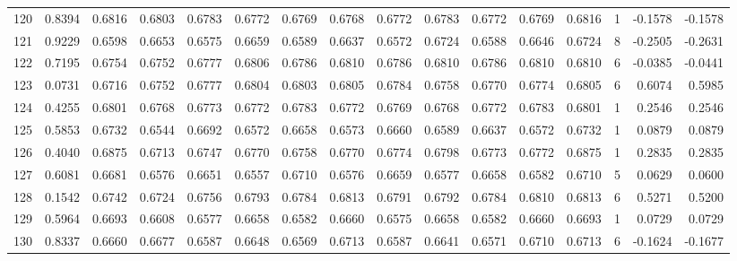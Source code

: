 \begin{tabular}{lrrrrrrrrrrrrrrr}
120 &      0.8394 &  0.6816 &  0.6803 &  0.6783 &  0.6772 &  0.6769 &  0.6768 &  0.6772 &  0.6783 &  0.6772 &   0.6769 &     0.6816 &      1 &                   -0.1578 &                    -0.1578 \\
121 &      0.9229 &  0.6598 &  0.6653 &  0.6575 &  0.6659 &  0.6589 &  0.6637 &  0.6572 &  0.6724 &  0.6588 &   0.6646 &     0.6724 &      8 &                   -0.2505 &                    -0.2631 \\
122 &      0.7195 &  0.6754 &  0.6752 &  0.6777 &  0.6806 &  0.6786 &  0.6810 &  0.6786 &  0.6810 &  0.6786 &   0.6810 &     0.6810 &      6 &                   -0.0385 &                    -0.0441 \\
123 &      0.0731 &  0.6716 &  0.6752 &  0.6777 &  0.6804 &  0.6803 &  0.6805 &  0.6784 &  0.6758 &  0.6770 &   0.6774 &     0.6805 &      6 &                    0.6074 &                     0.5985 \\
124 &      0.4255 &  0.6801 &  0.6768 &  0.6773 &  0.6772 &  0.6783 &  0.6772 &  0.6769 &  0.6768 &  0.6772 &   0.6783 &     0.6801 &      1 &                    0.2546 &                     0.2546 \\
125 &      0.5853 &  0.6732 &  0.6544 &  0.6692 &  0.6572 &  0.6658 &  0.6573 &  0.6660 &  0.6589 &  0.6637 &   0.6572 &     0.6732 &      1 &                    0.0879 &                     0.0879 \\
126 &      0.4040 &  0.6875 &  0.6713 &  0.6747 &  0.6770 &  0.6758 &  0.6770 &  0.6774 &  0.6798 &  0.6773 &   0.6772 &     0.6875 &      1 &                    0.2835 &                     0.2835 \\
127 &      0.6081 &  0.6681 &  0.6576 &  0.6651 &  0.6557 &  0.6710 &  0.6576 &  0.6659 &  0.6577 &  0.6658 &   0.6582 &     0.6710 &      5 &                    0.0629 &                     0.0600 \\
128 &      0.1542 &  0.6742 &  0.6724 &  0.6756 &  0.6793 &  0.6784 &  0.6813 &  0.6791 &  0.6792 &  0.6784 &   0.6810 &     0.6813 &      6 &                    0.5271 &                     0.5200 \\
129 &      0.5964 &  0.6693 &  0.6608 &  0.6577 &  0.6658 &  0.6582 &  0.6660 &  0.6575 &  0.6658 &  0.6582 &   0.6660 &     0.6693 &      1 &                    0.0729 &                     0.0729 \\
130 &      0.8337 &  0.6660 &  0.6677 &  0.6587 &  0.6648 &  0.6569 &  0.6713 &  0.6587 &  0.6641 &  0.6571 &   0.6710 &     0.6713 &      6 &                   -0.1624 &                    -0.1677 \\

\end{tabular}
